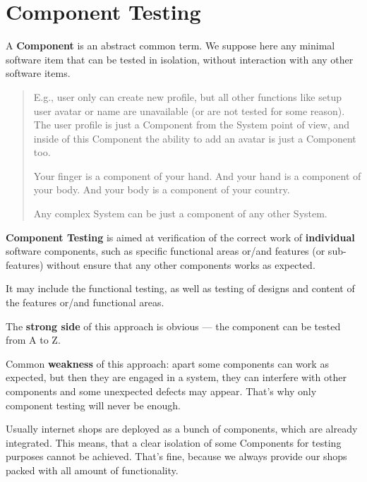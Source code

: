 \section{Component Testing}
\label{sec:Component Testing}

A \textbf{Component} is an abstract common term. We suppose here any minimal software item that can be tested in isolation, without interaction with any other software items.

\begin{quote}
E.g., user only can create new profile, but all other functions like setup user avatar or name are unavailable (or are not tested for some reason). The user profile is just a Component from the System point of view, and inside of this Component the ability to add an avatar is just a Component too.

Your finger is a component of your hand. And your hand is a component of your body. And your body is a component of your country. 

Any complex System can be just a component of any other System.\end{quote} 

\textbf{Component Testing} is aimed at verification of the correct work of \textbf{individual} software components, such as specific functional areas or/and features (or sub-features) without ensure that any other components works as expected.

It may include the functional testing, as well as testing of designs and content of the features or/and functional areas.

The \textbf{strong side} of this approach is obvious — the component can be tested from A to Z.

Common \textbf{weakness} of this approach: apart some components can work as expected, but then they are engaged in a system, they can interfere with other components and some unexpected defects may appear. That's why only component testing will never be enough.

Usually internet shops are deployed as a bunch of components, which are already integrated. This means, that a clear isolation of some Components for testing purposes cannot be achieved. That's fine, because we always provide our shops packed with all amount of functionality.